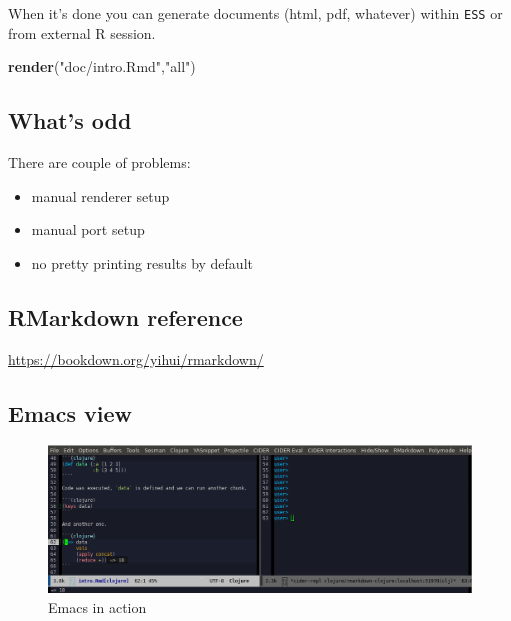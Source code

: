 \documentclass[]{article}
\newenvironment{Shaded}{\begin{snugshade}}{\end{snugshade}}
\newcommand{\KeywordTok}[1]{\textcolor[rgb]{0.13,0.29,0.53}{\textbf{#1}}}
\newcommand{\StringTok}[1]{\textcolor[rgb]{0.31,0.60,0.02}{#1}}
\newcommand{\NormalTok}[1]{#1}
\providecommand{\tightlist}{%
  \setlength{\itemsep}{0pt}\setlength{\parskip}{0pt}}
\begin{document}
When it's done you can generate documents (html, pdf, whatever) within
\texttt{ESS} or from external R session.

\begin{Shaded}
\begin{Highlighting}[]
\KeywordTok{render}\NormalTok{(}\StringTok{"doc/intro.Rmd"}\NormalTok{,}\StringTok{"all"}\NormalTok{)}
\end{Highlighting}
\end{Shaded}

\subsection{What's odd}\label{whats-odd}

There are couple of problems:

\begin{itemize}
\tightlist
\item
  manual renderer setup
\item
  manual port setup
\item
  no pretty printing results by default
\end{itemize}

\subsection{RMarkdown reference}\label{rmarkdown-reference}

\url{https://bookdown.org/yihui/rmarkdown/}

\subsection{Emacs view}\label{emacs-view}

\begin{figure}
\centering
\includegraphics{emacs.png}
\caption{Emacs in action}
\end{figure}
\end{document}

